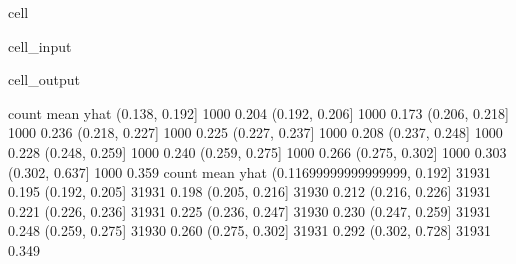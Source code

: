 \documentclass[letterpaper,10pt,english]{jupyterBook}
\begin{document}
\begin{sphinxuseclass}{cell}\begin{sphinxVerbatimInput}

\begin{sphinxuseclass}{cell_input}
\begin{sphinxVerbatim}[commandchars=\\\{\}]
   
      \PYG{p}{[} \PYG{p}{]} 
      \PYG{p}{[}\PYG{p}{]} 
    \PYG{p}{[}\PYG{p}{]}\PYG{p}{[}\PYG{p}{]}
    \PYG{p}{[}\PYG{p}{]}

 
 
\end{sphinxVerbatim}

\end{sphinxuseclass}\end{sphinxVerbatimInput}
\begin{sphinxVerbatimOutput}

\begin{sphinxuseclass}{cell_output}
\begin{sphinxVerbatim}[commandchars=\\\{\}]
                count  mean
yhat                       
(0.138, 0.192]   1000 0.204
(0.192, 0.206]   1000 0.173
(0.206, 0.218]   1000 0.236
(0.218, 0.227]   1000 0.225
(0.227, 0.237]   1000 0.208
(0.237, 0.248]   1000 0.228
(0.248, 0.259]   1000 0.240
(0.259, 0.275]   1000 0.266
(0.275, 0.302]   1000 0.303
(0.302, 0.637]   1000 0.359
                              count  mean
yhat                                     
(0.11699999999999999, 0.192]  31931 0.195
(0.192, 0.205]                31931 0.198
(0.205, 0.216]                31930 0.212
(0.216, 0.226]                31931 0.221
(0.226, 0.236]                31931 0.225
(0.236, 0.247]                31930 0.230
(0.247, 0.259]                31931 0.248
(0.259, 0.275]                31930 0.260
(0.275, 0.302]                31931 0.292
(0.302, 0.728]                31931 0.349
\end{sphinxVerbatim}


\end{sphinxuseclass}
\end{sphinxVerbatimOutput}
\end{sphinxuseclass}
\end{document}
